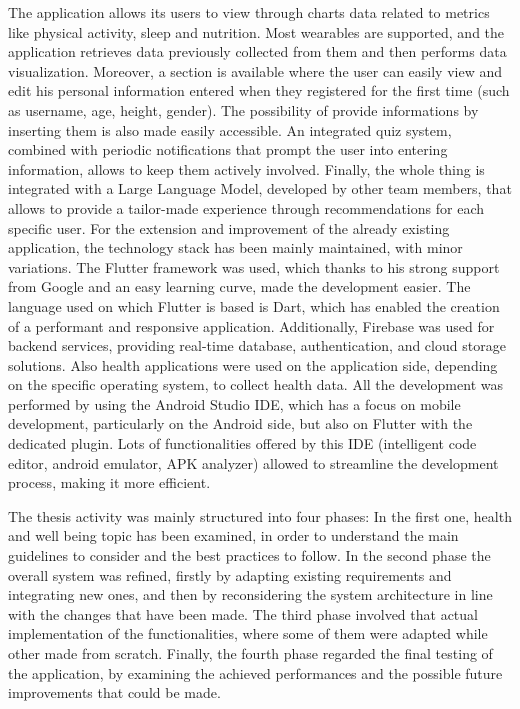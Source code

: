 \noindent The application allows its users to view through charts data related to metrics like physical activity, sleep and nutrition. Most wearables are supported, and the application retrieves data previously collected from them and then performs data visualization. Moreover, a section is available where the user can easily view and edit his personal information entered when they registered for the first time (such as username, age, height, gender). The possibility of provide informations by inserting them is also made easily accessible. An integrated quiz system, combined with periodic notifications that prompt the user into entering information, allows to keep them actively involved. Finally, the whole thing is integrated with a Large Language Model, developed by other team members, that allows to provide a tailor-made experience through recommendations for each specific user.
\newpage
\noindent For the extension and improvement of the already existing application, the technology stack has been mainly maintained, with minor variations. The Flutter framework was used, which thanks to his strong support from Google and an easy learning curve, made the development easier. The language used on which Flutter is based is Dart, which has enabled the creation of a performant and responsive application. Additionally, Firebase was used for backend services, providing real-time database, authentication, and cloud storage solutions. Also health applications were used on the application side, depending on the specific operating system, to collect health data. All the development was performed by using the Android Studio IDE, which has a focus on mobile development, particularly on the Android side, but also on Flutter with the dedicated plugin. Lots of functionalities offered by this IDE (intelligent code editor, android emulator, APK analyzer) allowed to streamline the development process, making it more efficient.

\noindent The thesis activity was mainly structured into four phases: In the first one, health and well being topic has been examined, in order to understand the main guidelines to consider and the best practices to follow. In the second phase the overall system was refined, firstly by adapting existing requirements and integrating new ones, and then by reconsidering the system architecture in line with the changes that have been made. The third phase involved that actual implementation of the functionalities, where some of them were adapted while other made from scratch. Finally, the fourth phase regarded the final testing of the application, by examining the achieved performances and the possible future improvements that could be made.